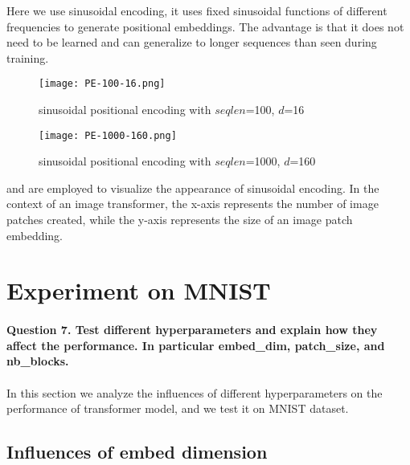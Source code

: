 \documentclass{article}
\begin{document}
Here we use sinusoidal encoding, it uses fixed sinusoidal functions of different frequencies to generate positional embeddings. The advantage is that it does not need to be learned and can generalize to longer sequences than seen during training. 

\begin{figure}[H]
    \centering
    \texttt{[image: PE-100-16.png]}
    \caption{sinusoidal positional encoding with $seqlen$=100, $d$=16}
    \label{fig:pe-viz1}
    
\end{figure}


\begin{figure}[H]
    \centering
    \texttt{[image: PE-1000-160.png]}
    \caption{sinusoidal positional encoding with $seqlen$=1000, $d$=160}
    \label{fig:pe-viz2}
    
\end{figure}

 and   are employed to visualize the appearance of sinusoidal encoding. In the context of an image transformer, the x-axis represents the number of image patches created, while the y-axis represents the size of an image patch embedding.  

\section{Experiment on MNIST}

\paragraph{
Question 7. Test different hyperparameters and explain how they affect the performance. In particular embed\_dim, patch\_size, and nb\_blocks.}
\paragraph{}

In this section we analyze the influences of different hyperparameters on the performance of transformer model, and we test it on MNIST dataset.
\subsection{Influences of embed dimension}

\paragraph{}
\end{document}
